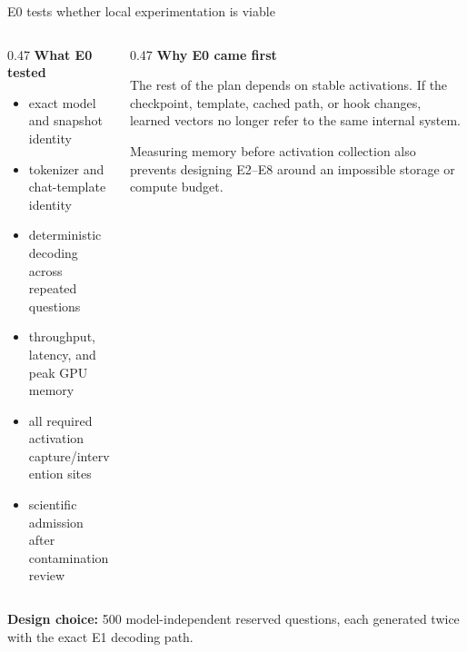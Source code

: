 \documentclass[aspectratio=169,11pt]{beamer}
\begin{document}
\begin{frame}{E0 tests whether local experimentation is viable}
  \footnotesize
  \begin{columns}[T,onlytextwidth]
    \begin{column}{0.47\textwidth}
      \textbf{What E0 tested}\par\vspace{0.15cm}
      \begin{itemize}\setlength\itemsep{0.04cm}
        \item exact model and snapshot identity
        \item tokenizer and chat-template identity
        \item deterministic decoding across repeated questions
        \item throughput, latency, and peak GPU memory
        \item all required activation capture/intervention sites
        \item scientific admission after contamination review
      \end{itemize}
    \end{column}
    \begin{column}{0.47\textwidth}
      \textbf{Why E0 came first}\par\vspace{0.15cm}
      The rest of the plan depends on stable activations. If the checkpoint, template, cached path, or hook changes, learned vectors no longer refer to the same internal system.\par\vspace{0.2cm}
      Measuring memory before activation collection also prevents designing E2--E8 around an impossible storage or compute budget.
    \end{column}
  \end{columns}
  \vspace{0.14cm}
  {\scriptsize\color{Muted}\textbf{Design choice:} 500 model-independent reserved questions, each generated twice with the exact E1 decoding path.}
\end{frame}
\end{document}
